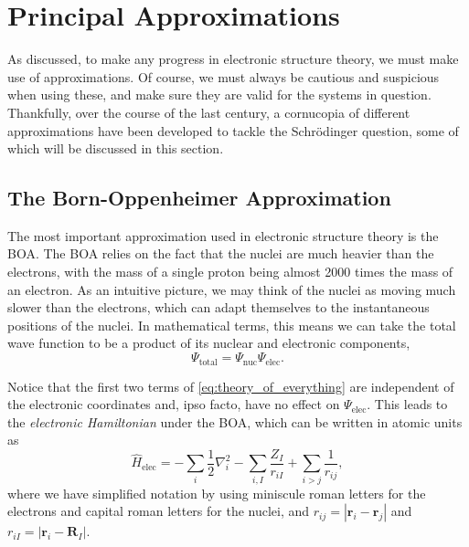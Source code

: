 \section{Principal Approximations}

As discussed, to make any progress in electronic structure theory, we must make use of approximations. Of course, we must always be cautious and suspicious when using these, and make sure they are valid for the systems in question. Thankfully, over the course of the last century, a cornucopia of different approximations have been developed to tackle the Schr\"odinger question, some of which will be discussed in this section.

\subsection{The Born-Oppenheimer Approximation}

The most important approximation used in electronic structure theory is the \gls{BOA}. The \gls{BOA} relies on the fact that the nuclei are much heavier than the electrons, with the mass of a single proton being almost 2000 times the mass of an electron. As an intuitive picture, we may think of the nuclei as moving much slower than the electrons, which can adapt themselves to the instantaneous positions of the nuclei. In mathematical terms, this means we can take the total wave function to be a product of its nuclear and electronic components,
\begin{equation}
    \Psi_\mathrm{total} = \Psi_\mathrm{nuc} \Psi_\mathrm{elec}.
\end{equation}

Notice that the first two terms of \eqref{eq:theory_of_everything} are independent of the electronic coordinates and, ipso facto, have no effect on $\Psi_\mathrm{elec}$. This leads to the \emph{electronic Hamiltonian} under the \gls{BOA}, which can be written in atomic units as
\begin{equation}
\label{eq:elec_hamiltonian}
\hat H_\mathrm{elec} = -\sum_{i} \frac{1}{2} \nabla_i^2 - \sum_{i,I} \frac{Z_I}{r_{iI}} + \sum_{i\gt j} \frac{1}{r_{ij}},
\end{equation}
where we have simplified notation by using miniscule roman letters for the electrons and capital roman letters for the nuclei, and $r_{ij}=|\mathbf{r}_i-\mathbf{r}_j|$ and $r_{iI}=|\mathbf{r}_i-\mathbf{R}_I|$.

